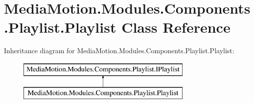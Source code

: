 \hypertarget{class_media_motion_1_1_modules_1_1_components_1_1_playlist_1_1_playlist}{\section{Media\+Motion.\+Modules.\+Components.\+Playlist.\+Playlist Class Reference}
\label{class_media_motion_1_1_modules_1_1_components_1_1_playlist_1_1_playlist}
}
Inheritance diagram for Media\+Motion.\+Modules.\+Components.\+Playlist.\+Playlist\+:\begin{figure}[H]
\begin{center}
\leavevmode
\includegraphics[height=2.000000cm]{class_media_motion_1_1_modules_1_1_components_1_1_playlist_1_1_playlist}
\end{center}
\end{figure}
